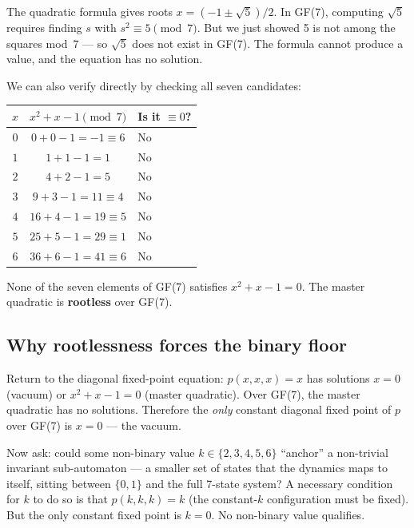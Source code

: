 \documentclass[11pt,a4paper]{article}
\newcommand{\term}[1]{\textbf{#1}}
\begin{document}
The quadratic formula gives roots $x = (-1 \pm \sqrt{5})/2$.  In GF(7),
computing $\sqrt{5}$ requires finding $s$ with $s^2 \equiv 5 \pmod 7$.  But
we just showed 5 is not among the squares mod~7 — so $\sqrt{5}$ does not
exist in GF(7).  The formula cannot produce a value, and the equation has
no solution.

We can also verify directly by checking all seven candidates:

\bigskip
\begin{center}
\begin{tabular}{ccl}
\toprule
$x$ & $x^2 + x - 1 \pmod 7$ & Is it $\equiv 0$? \\
\midrule
$0$ & $0 + 0 - 1 = -1 \equiv 6$      & No \\
$1$ & $1 + 1 - 1 = 1$                & No \\
$2$ & $4 + 2 - 1 = 5$                & No \\
$3$ & $9 + 3 - 1 = 11 \equiv 4$      & No \\
$4$ & $16 + 4 - 1 = 19 \equiv 5$     & No \\
$5$ & $25 + 5 - 1 = 29 \equiv 1$     & No \\
$6$ & $36 + 6 - 1 = 41 \equiv 6$     & No \\
\bottomrule
\end{tabular}
\end{center}
\bigskip

None of the seven elements of GF(7) satisfies $x^2 + x - 1 = 0$.
The master quadratic is \term{rootless} over GF(7).

\subsection{Why rootlessness forces the binary floor}

Return to the diagonal fixed-point equation: $p(x,x,x) = x$ has solutions
$x = 0$ (vacuum) or $x^2 + x - 1 = 0$ (master quadratic).  Over GF(7),
the master quadratic has no solutions.  Therefore the \emph{only} constant
diagonal fixed point of $p$ over GF(7) is $x = 0$ — the vacuum.

Now ask: could some non-binary value $k \in \{2, 3, 4, 5, 6\}$ ``anchor''
a non-trivial invariant sub-automaton — a smaller set of states that the
dynamics maps to itself, sitting between $\{0,1\}$ and the full 7-state system?
A necessary condition for $k$ to do so is that $p(k,k,k) = k$ (the constant-$k$
configuration must be fixed).  But the only constant fixed point is $k = 0$.
No non-binary value qualifies.
\end{document}

